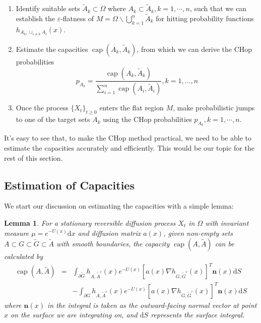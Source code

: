 \documentclass[english, aip, jcp, priprint, graphicx]{revtex4-1}
\newcommand{\mathd}{\mathrm{d}}
\newtheorem{lemma}{Lemma}
\theoremstyle{plain}
\theoremstyle{definition}
\theoremstyle{plain}
\begin{document}
\begin{enumerate}
	\item Identify suitable sets $\tilde A_k \subset \Omega$ where $A_k \subset \tilde{A}_k, k=1, \cdots, n$, such that we can establish the $\varepsilon$-flatness of $M = \Omega \backslash \bigcup_{k = 1}^n \tilde{A}_k $ for hitting probability functions $h_{A_k,\cup_{i\neq k} A_i}(x)$.
	\item Estimate the capacities $\ensuremath{\operatorname{cap}} (A_k, \tilde{A}_k)$, from which we can derive the CHop probabilities
\begin{equation*}
p_{A_k} = \frac{\ensuremath{\operatorname{cap}} (A_k, \tilde{A}_k)}{\sum_{i = 1}^n \ensuremath{\operatorname{cap}} (A_i, \tilde{A}_i)}, k=1,\dots, n
\end{equation*} 
	\item Once the process $\{X_t\}_{t \geq 0}$ enters the flat region $M$, make probabilistic jumps to one of the target sets $A_k$ using the CHop probabilities $p_{A_k}, k=1, \cdots, n$.
\end{enumerate}

It's easy to see that, to make the CHop method practical, we need to be able to estimate the capacities accurately and efficiently. This would be our topic for the rest of this section.

\subsection{Estimation of Capacities}

We start our discussion on estimating the capacities with a simple lemma:
\begin{lemma}\label{thm:capacity_lemma}
For a stationary reversible  diffusion process $X_t$ in $\Omega$ with
invariant measure ${\mu}= e^{- U (x)} \mathrm{d} x$ and diffusion matrix
$a (x)$, given non-empty sets $A \subset G \subset \tilde{G} \subset
\tilde{A}$ with smooth boundaries, the capacity
$\ensuremath{\operatorname{cap}} (A, \tilde{A})$ can be calculated by
\begin{eqnarray*}
\ensuremath{\operatorname{cap}} (A, \tilde{A}) & = & \int_{\partial
\tilde{G}}  h_{A,
\tilde{A}^c} (x) e^{- U (x)} [a (x) \nabla h_{G, \tilde{G}^c} (x)]^T \textbf{n} (x)\mathd S\\
&   & - \int_{\partial G}  h_{A, \tilde{A}^c} (x) e^{- U (x)} [a (x) \nabla h_{G, \tilde{G}^c} (x)]^T \textbf{n} (x)\mathd S
\end{eqnarray*}
where ${\textbf{n}} (x)$ in the integral is taken as the outward-facing normal vector at point $x$ on the surface we are integrating on, and $\mathd S$ represents the surface integral.
\end{lemma}
\end{document}
